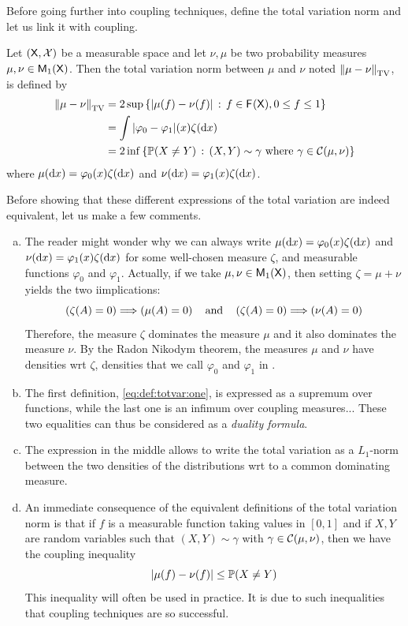 \documentclass[english,graybox,envcountchap,envcountsame,sectrefs,shortlabels]{svmono}
\theoremstyle{style}
\begin{document}
Before going further into coupling techniques,  define the total variation norm and let us link it with coupling.
\begin{definition} \label{def:totvar}
Let $(\mathsf{X},\mathcal{X})$ be a measurable space and let $\nu,\mu$ be two probability measures $\mu,\nu \in \mathsf{M}_{1}(\mathsf{X})$. Then the total variation norm between $\mu$ and $\nu$ noted $\left\|\mu-\nu\right\|_{\mathrm{TV}}$, is defined by
\begin{align}
\left\|\mu-\nu\right\|_{\mathrm{TV}}&=2\sup\left\{ |\mu(f)-\nu(f)|\,:\,f\in \mathsf{F_{}}(\mathsf{X}), 0\leq f\leq 1\right\} \label{eq:def:totvar:one}\\
&=\int |\varphi_0-\varphi_1|(x) \zeta(\mathrm{d} x) \label{eq:def:totvar:two}\\
&=2\inf\left\{ \mathbb{P}(X\neq Y) \,:\, (X,Y) \sim \gamma \mbox{ where } \gamma \in \mathcal{C}(\mu,\nu)\right\} \label{eq:def:totvar:three}
\end{align}
where $\mu(\mathrm{d} x)=\varphi_0(x) \zeta(\mathrm{d} x)$ and $\nu(\mathrm{d} x)=\varphi_1(x) \zeta(\mathrm{d} x)$.
\end{definition}
Before showing that these different expressions of the total variation are indeed equivalent, let us make a few comments.
\begin{enumerate}[(a)]
\item The reader might wonder why we can always write $\mu(\mathrm{d} x)=\varphi_0(x) \zeta(\mathrm{d} x)$ and $\nu(\mathrm{d} x)=\varphi_1(x) \zeta(\mathrm{d} x)$ for some well-chosen measure $\zeta$, and measurable functions $\varphi_0$ and $\varphi_1$. Actually, if we take $\mu,\nu \in \mathsf{M}_{1}(\mathsf{X})$, then setting $\zeta=\mu+\nu$ yields the two iimplications:
 $$
 \left(\zeta(A)=0\right) \Longrightarrow \left(\mu(A)=0\right) \quad \mbox{and} \quad   \left(\zeta(A)=0\right) \Longrightarrow \left(\nu(A)=0\right)
 $$
Therefore, the measure $\zeta$ dominates the measure $\mu$ and it also dominates the measure $\nu$. By the Radon Nikodym theorem, the measures $\mu$ and $\nu$ have densities wrt $\zeta$, densities that we call $\varphi_0$ and $\varphi_1$ in .
\item The first definition, \eqref{eq:def:totvar:one}, is expressed as a supremum over functions, while the last one is an infimum over coupling measures... These two equalities can thus be considered as a {\em duality formula}.
\item The expression in the middle allows to write the total variation as a $L_1$-norm between the two densities of the distributions wrt to a common dominating measure.
\item An immediate consequence of the equivalent definitions of the total variation norm is that if $f$ is a measurable function taking values in $[0,1]$ and if $X,Y$ are random variables such that $(X,Y)\sim \gamma$ with $\gamma\in \mathcal{C}(\mu,\nu)$, then we have the coupling inequality 
$$
|\mu(f)-\nu(f)|\leq \mathbb{P}(X\neq Y)
$$
This inequality will often be used in practice. It is due to such inequalities that coupling techniques are so successful.
\end{enumerate}
\end{document}
